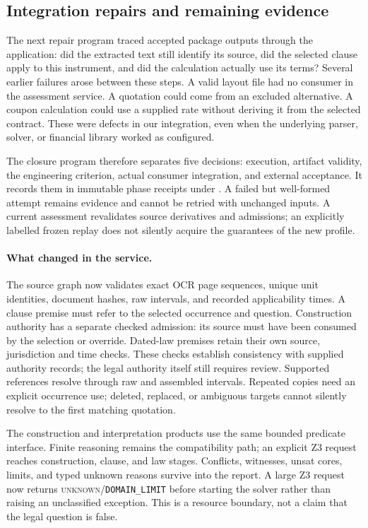 \subsection{Integration repairs and remaining evidence}
\label{sec:prospectus-integration-closure}

The next repair program traced accepted package outputs through the application:
did the extracted text still identify its source, did the selected clause apply
to this instrument, and did the calculation actually use its terms?  Several
earlier failures arose between these steps.  A valid layout file had no consumer
in the assessment service.  A quotation could come from an excluded alternative.
A coupon calculation could use a supplied rate without deriving it from the
selected contract.  These were defects in our integration, even when the
underlying parser, solver, or financial library worked as configured.

The closure program therefore separates five decisions: execution, artifact
validity, the engineering criterion, actual consumer integration, and external
acceptance.  It records them in immutable phase receipts under
.  A failed but
well-formed attempt remains evidence and cannot be retried with unchanged
inputs.  A current assessment revalidates source derivatives and admissions;
an explicitly labelled frozen replay does not silently acquire the guarantees
of the new profile.

\paragraph{What changed in the service.}
The source graph now validates exact OCR page sequences, unique unit identities,
document hashes, raw intervals, and recorded applicability times.  A clause
premise must refer to the selected occurrence and question.  Construction
authority has a separate checked admission: its source must have been consumed
by the selection or override.  Dated-law premises retain their own source,
jurisdiction and time checks.  These checks establish consistency with supplied
authority records; the legal authority itself still requires review.  Supported
references resolve through raw and assembled intervals.  Repeated copies need
an explicit occurrence use; deleted, replaced, or ambiguous targets cannot
silently resolve to the first matching quotation.

The construction and interpretation products use the same bounded predicate
interface.  Finite reasoning remains the compatibility path; an explicit Z3
request reaches construction, clause, and law stages.  Conflicts, witnesses,
unsat cores, limits, and typed unknown reasons survive into the report.  A
large Z3 request now returns \textsc{unknown}/\texttt{DOMAIN\_LIMIT} before
starting the solver rather than raising an unclassified exception.  This is a
resource boundary, not a claim that the legal question is false.

